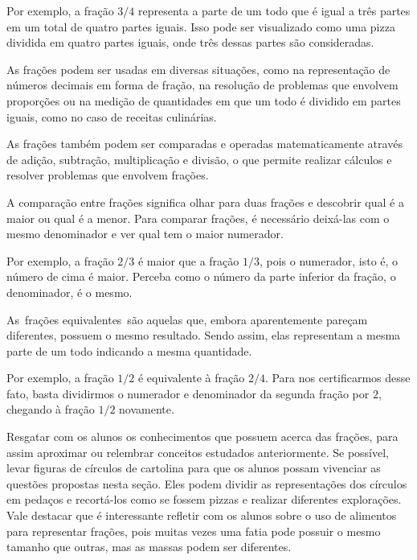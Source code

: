 {{Por exemplo, a fração $3/4$ representa a parte de um todo que é igual a
três partes em um total de quatro partes iguais. Isso pode ser
visualizado como uma pizza dividida em quatro partes iguais, onde três
dessas partes são consideradas.

As frações podem ser usadas em diversas situações, como na representação
de números decimais em forma de fração, na resolução de problemas que
envolvem proporções ou na medição de quantidades em que um todo é
dividido em partes iguais, como no caso de receitas culinárias.

As frações também podem ser comparadas e operadas matematicamente
através de adição, subtração, multiplicação e divisão, o que permite
realizar cálculos e resolver problemas que envolvem frações.


A comparação entre frações significa olhar para duas frações e descobrir
qual é a maior ou qual é a menor. Para comparar frações, é necessário
deixá-las com o mesmo denominador e ver qual tem o maior numerador.

Por exemplo, a fração $2/3$ é maior que a fração $1/3$, pois o numerador,
isto é, o número de cima é maior. Perceba como o número da parte
inferior da fração, o denominador, é o mesmo.

As~frações equivalentes~são aquelas que, embora aparentemente pareçam
diferentes, possuem o mesmo resultado. Sendo assim, elas representam a
mesma parte de um todo indicando a mesma quantidade.

Por exemplo, a fração $1/2$ é equivalente à fração $2/4$. Para nos
certificarmos desse fato, basta dividirmos o numerador e denominador da
segunda fração por $2$, chegando à fração $1/2$ novamente.

Resgatar com os alunos os conhecimentos que possuem acerca das frações,
para assim aproximar ou relembrar conceitos estudados anteriormente. Se
possível, levar figuras de círculos de cartolina para que os alunos
possam vivenciar as questões propostas nesta seção. Eles podem dividir
as representações dos círculos em pedaços e recortá-los como se fossem
pizzas e realizar diferentes explorações. Vale destacar que é
interessante refletir com os alunos sobre o uso de alimentos para
representar frações, pois muitas vezes uma fatia pode possuir o mesmo
tamanho que outras, mas as massas podem ser diferentes.}

}
